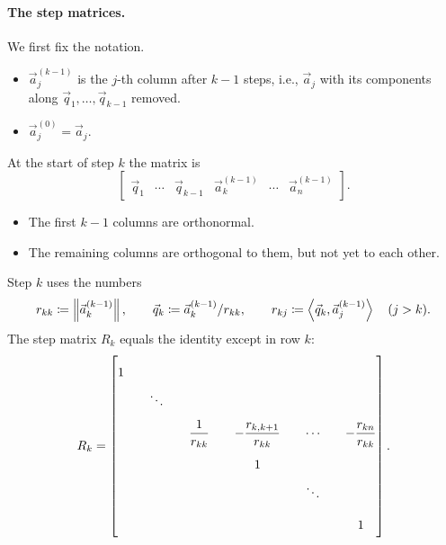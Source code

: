 \paragraph{The step matrices.} We first fix the notation.
\begin{itemize}
  \item $\vec{a}_j^{(k-1)}$ is the $j$-th column after $k - 1$ steps, i.e., $\vec{a}_j$ with its components along $\vec{q}_1, \dots, \vec{q}_{k-1}$ removed.
  \item $\vec{a}_j^{(0)} = \vec{a}_j$.
\end{itemize}

At the start of step $k$ the matrix is
\begin{equation}
  \begin{bmatrix} \vec{q}_1 & \cdots & \vec{q}_{k-1} & \vec{a}_k^{(k-1)} & \cdots & \vec{a}_n^{(k-1)} \end{bmatrix}.
\end{equation}
\begin{itemize}
  \item The first $k - 1$ columns are orthonormal.
  \item The remaining columns are orthogonal to them, but not yet to each other.
\end{itemize}

Step $k$ uses the numbers
\begin{equation}
  r_{kk} \coloneqq \left\lVert \vec{a}_k^{(k-1)} \right\rVert, \qquad \vec{q}_k \coloneqq \vec{a}_k^{(k-1)}/r_{kk}, \qquad r_{kj} \coloneqq \left\langle \vec{q}_k, \vec{a}_j^{(k-1)} \right\rangle \quad (j > k).
\end{equation}
The step matrix $R_k$ equals the identity except in row $k$:
\begin{equation}
  R_k = \renewcommand{\arraystretch}{2}\setlength{\arraycolsep}{10pt}\begin{bmatrix}
    1 & & & & & \\
    & \ddots & & & & \\
    & & \dfrac{1}{r_{kk}} & -\dfrac{r_{k,k+1}}{r_{kk}} & \cdots & -\dfrac{r_{kn}}{r_{kk}} \\
    & & & 1 & & \\
    & & & & \ddots & \\
    & & & & & 1
  \end{bmatrix}.
\end{equation}

